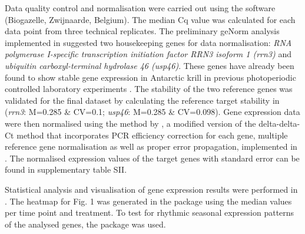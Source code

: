 Data quality control and normalisation were carried out using the software
 (Biogazelle, Zwijnaarde, Belgium). The median Cq value was
calculated for each data point from three technical replicates. The preliminary
geNorm analysis \citep{vandesompele_accurate_2002} implemented in 
suggested two housekeeping genes for data normalisation: \textit{RNA polymerase
I-specific transcription initiation factor RRN3 isoform 1 (rrn3)} and
\textit{ubiquitin carboxyl-terminal hydrolase 46 (usp46)}. These genes have
already been found to show stable gene expression in Antarctic krill in
previous photoperiodic controlled laboratory experiments \citep[; Bisconton et
al., in prep.]{piccolin_seasonal_2018}. The stability of the two reference
genes was validated for the final dataset by calculating the reference target
stability in  (\textit{rrn3}: M=0.285 \& CV=0.1; \textit{usp46}:
M=0.285 \& CV=0.098). Gene expression data were then normalised using the
method by \citet{hellemans_qbase_2007}, a modified version of the
delta-delta-Ct method that incorporates PCR efficiency correction for each
gene, multiple reference gene normalisation as well as proper error
propagation, implemented in . The normalised expression values of
the target genes with standard error can be found in supplementary table SII.


Statistical analysis and visualisation of gene expression results were
performed in  \citep{rstudio_team_rstudio:_2016}.
The heatmap for Fig. 1 was generated in the  package 
\citep{warnes_gplots:_2016} using the median values per time point and
treatment. To test for rhythmic seasonal expression patterns of the analysed
genes, the  package  \citep{thaben_detecting_2014} was used.

